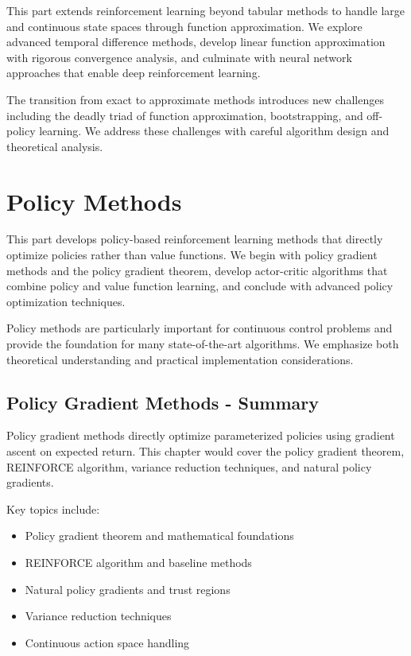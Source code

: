 \documentclass[11pt,twoside,openright]{book}
\begin{document}
This part extends reinforcement learning beyond tabular methods to handle large and continuous state spaces through function approximation. We explore advanced temporal difference methods, develop linear function approximation with rigorous convergence analysis, and culminate with neural network approaches that enable deep reinforcement learning.

The transition from exact to approximate methods introduces new challenges including the deadly triad of function approximation, bootstrapping, and off-policy learning. We address these challenges with careful algorithm design and theoretical analysis.





\part{Policy Methods}

This part develops policy-based reinforcement learning methods that directly optimize policies rather than value functions. We begin with policy gradient methods and the policy gradient theorem, develop actor-critic algorithms that combine policy and value function learning, and conclude with advanced policy optimization techniques.

Policy methods are particularly important for continuous control problems and provide the foundation for many state-of-the-art algorithms. We emphasize both theoretical understanding and practical implementation considerations.


\chapter{Policy Gradient Methods - Summary}
\label{ch:policy-gradients-summary}

\begin{keyideabox}
Policy gradient methods directly optimize parameterized policies using gradient ascent on expected return. This chapter would cover the policy gradient theorem, REINFORCE algorithm, variance reduction techniques, and natural policy gradients.
\end{keyideabox}

Key topics include:
\begin{itemize}
\item Policy gradient theorem and mathematical foundations
\item REINFORCE algorithm and baseline methods
\item Natural policy gradients and trust regions
\item Variance reduction techniques
\item Continuous action space handling
\end{itemize}
\end{document}
